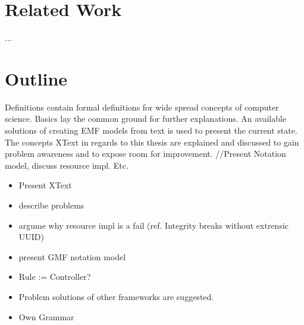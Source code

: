 \section{Related Work}
... %

\section{Outline}
Definitions contain formal definitions for wide spread concepts of computer science. Basics lay the common ground for further explanations. An available solutions of creating EMF models from text is used to present the current state. The concepts XText in regards to this thesis are explained and discussed to gain problem awareness and to expose room for improvement. //Present Notation model, discuss resource impl. Etc. 
\begin{itemize}
	\item Present XText
	\item describe problems
	\item argume why resource impl is a fail (ref. Integrity breaks without extrensic UUID)
	\item present GMF notation model
	\item Rule := Controller?
	\item Problem solutions of other frameworks are suggested.
	\item Own Grammar
\end{itemize}